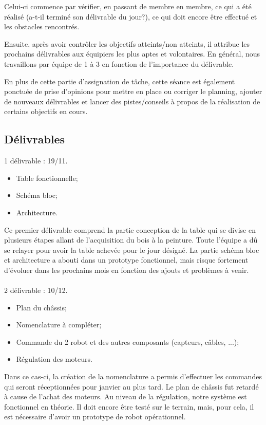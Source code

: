 \noindent Celui-ci commence par vérifier, en passant de membre en membre, ce qui a été réalisé (a-t-il terminé son délivrable du jour?), ce qui doit encore être effectué et les obstacles rencontrés.

\noindent Ensuite, après avoir contrôler les objectifs atteints/non atteints, il attribue les prochains délivrables aux équipiers les plus aptes et volontaires. En général, nous travaillons par équipe de 1 à 3 en fonction de l'importance du délivrable. 

\noindent En plus de cette partie d'assignation de tâche, cette séance est également ponctuée de prise d'opinions pour mettre en place ou corriger le planning, ajouter de nouveaux délivrables et lancer des pistes/conseils à propos de la réalisation de certains objectifs en cours.

\subsection{Délivrables}

1 délivrable : 19/11.
\begin{itemize}
	\item Table fonctionnelle;
	\item Schéma bloc;
	\item Architecture.
\end{itemize}

\noindent Ce premier délivrable comprend la partie conception de la table qui se divise en plusieurs étapes allant de l'acquisition du bois à la peinture. Toute l'équipe a dû se relayer pour avoir la table achevée pour le jour désigné. La partie schéma bloc et architecture a abouti dans un prototype fonctionnel, mais risque fortement d'évoluer dans les prochains mois en fonction des ajouts et problèmes à venir.

\paragraph{}
2 délivrable : 10/12.
\begin{itemize}
	\item Plan du châssis;
	\item Nomenclature à compléter;
	\item Commande du 2 robot et des autres composants (capteurs, câbles, ...);
	\item Régulation des moteurs.
\end{itemize}

\noindent Dans ce cas-ci, la création de la nomenclature a permis d'effectuer les commandes qui seront réceptionnées pour janvier au plus tard. Le plan de châssis fut retardé à cause de l'achat des moteurs. Au niveau de la régulation, notre système est fonctionnel en théorie. Il doit encore être testé sur le terrain, mais, pour cela, il est nécessaire d'avoir un prototype de robot opérationnel.

